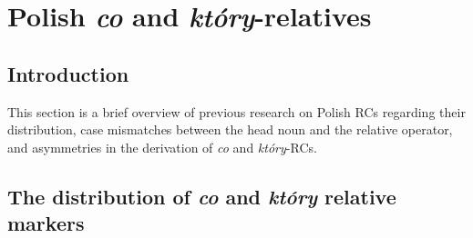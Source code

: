 \documentclass[output=paper]{langsci/langscibook}
\author{Paulina Łęska\affiliation{Adam Mickiewicz University in Poznań}}
\begin{document}
 

 

 

 

 

 

 

 

 



\section{Polish \textit{co} and \textit{który}{}-relatives}%
\subsection{Introduction}%
This section is a brief overview of previous research on Polish RCs regarding their distribution, case mismatches between the head noun and the relative operator, and asymmetries in the derivation of \textit{co} and \textit{który}{}-RCs. 

\subsection{The distribution of \textit{co} and \textit{który} relative markers}%
\end{document}
